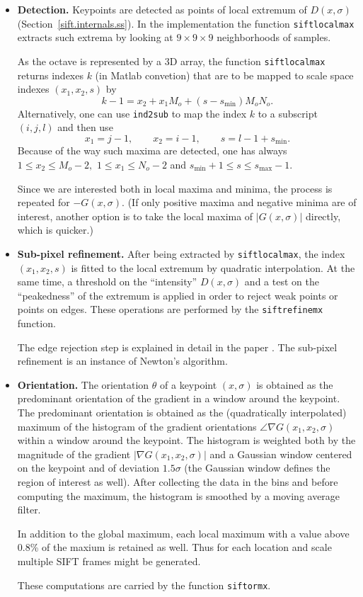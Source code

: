 \documentclass{article}
\newcommand{\Matlab}{{\sc Matlab}\xspace}
\let\oldtt=\tt
\renewcommand{\tt}{\oldtt\color{codecolor}}
\begin{document}
\begin{itemize}
\item {\bf Detection.} Keypoints are detected as points of local extremum of $D(x,\sigma)$ (Section~\ref{sift.internals.ss}). In the implementation the function {\tt siftlocalmax} extracts such extrema by looking at $9\times 9 \times 9$ neighborhoods of samples.

As the octave is represented by a 3D array, the function {\tt siftlocalmax} returns indexes $k$ (in \Matlab convetion) that are to be mapped to scale space indexes $(x_1,x_2,s)$ by
\[
  k-1 = x_2 + x_1 M_o + (s-s_{\min}) M_o N_o.
\]
Alternatively, one can use {\tt ind2sub} to map the index $k$ to a subscript $(i,j,l)$ and then use
\[
  x_1=j-1, \qquad
  x_2=i-1, \qquad
  s=l-1+s_{\min}.
\]
Because of the way such maxima are detected, one has always
$1\leq x_2 \leq M_o-2,$ $1\leq x_1 \leq N_o-2$ and $s_{\min}+1\leq s \leq s_{\max}-1$. 

Since we are interested both in local maxima and minima, the process is repeated for $-G(x,\sigma)$. (If only positive maxima and negative minima are of interest, another option is to take the local maxima of $|G(x,\sigma)|$ directly, which is quicker.)

\item {\bf Sub-pixel refinement.} After being extracted by {\tt siftlocalmax}, the index $(x_1,x_2,s)$ is fitted to the local extremum by quadratic interpolation. At the same time, a threshold on the ``intensity'' $D(x,\sigma)$ and a test on the ``peakedness'' of the extremum is applied in order to reject weak points or points on edges. These operations are performed by the {\tt siftrefinemx} function. 

The edge rejection step is explained in detail in the paper \cite{lowe04distinctive}. The sub-pixel refinement is an instance of Newton's algorithm.


\item {\bf Orientation.} The orientation $\theta$ of a keypoint $(x,\sigma)$ is
obtained as the predominant orientation of the gradient in a window around the keypoint. The predominant orientation is obtained as the (quadratically interpolated) maximum of the histogram of the gradient orientations $\angle \nabla G(x_1,x_2,\sigma)$ within a window around the keypoint. The histogram is weighted both by the magnitude of the gradient $|\nabla G(x_1,x_2,\sigma)|$ and a Gaussian window centered on the keypoint and of deviation $1.5\sigma$ (the Gaussian window defines the region of interest as well). After collecting the data in the bins and before computing the maximum, the histogram is smoothed by a moving average filter.

In addition to the global maximum, each local maximum with a value above 0.8\% of the maxium is retained as well. Thus for each location and scale multiple SIFT frames might be generated.

These computations are carried by the function {\tt siftormx}.

\end{itemize}
\end{document}
